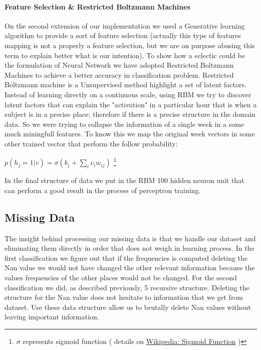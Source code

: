 \documentclass[paper=letter, fontsize=12pt]{article}
\begin{document}
\paragraph{Feature Selection \& Restricted Boltzmann Machines}
On the second extension of our implementation we used a Generative learning algorithm to provide a sort of feature selection (actually this type of features mapping is not a properly a feature selection, but we are on purpose abusing this term to explain better what is our intention).\newline
To show how a eclectic could be the formulation of Neural Network we have adopted Restricted Boltzmann Machines  to achieve a better accuracy in classification problem.
Restricted Boltzmann machine is a Unsupervised method highlight a set of latent factors.  Instead of learning directly on a continuous scale, using RBM we try to discover latent factors that can explain the "activation" in a particular hour that is when a subject is in a precise place; therefore if there is a precise structure in the domain data.
So we were trying to collapse the information of a single week in a some much miningfull features.
To know this we map the original week vectors in some other trained vector that perform the follow probability:
\begin{center}
$p(h_j = 1| v) =\sigma(b_j+ \sum_{i} v_iw_{ij})$ \footnote{ $\sigma$ represents sigmoid function ( details on \href{http://www.wikipedia.org/wiki/Sigmoid_function}{Wikipedia: Sigmoid Function} ) }
\end{center}
In the final structure of data we put in the RBM 100 hidden neuron unit that can perform a good result in the process of perceptron training.
\subsection{Missing Data}
The insight behind processing our missing data is that we handle our dataset and eliminating them directly in order that does not weigh in learning process.
In the first classification we figure out that if the frequencies is computed deleting the Nan value we would not have changed the other relevant information because the values frequencies of the other places would not be changed.\newline
For the second classification we did, as described previously, 5 recursive structure. Deleting the structure for the Nan value does not hesitate to information that we get from dataset.\newline
Use these data structure allow us to brutally delete Nan values without leaving important information.
\newline
\newline
\end{document}
